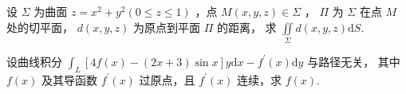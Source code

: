 \begin{problem}[points = 6]
设 $\Sigma$ 为曲面 $z = x^2 + y^2(0 \leq z \leq 1)$ ，点 $M(x, y, z) \in \Sigma$ ，
$\Pi$ 为 $\Sigma$ 在点 $M$ 处的切平面， $d(x, y, z)$ 为原点到平面 $\Pi$ 的距离，
求 $\iint\limits_\Sigma d(x, y, z)\mathrm{d}S$.
\end{problem}

\begin{problem}[points = 8]
设曲线积分 $\int_L [4f(x) - (2x + 3)\sin{x}]y\mathrm{d}x - f^{\prime}(x)\mathrm{d}y$ 与路径无关，
其中 $f(x)$ 及其导函数 $f^{\prime}(x)$ 过原点，且 $f^{\prime}(x)$ 连续，求 $f(x)$.
\end{problem}

